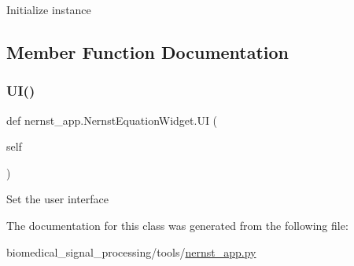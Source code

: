 \begin{DoxyVerb}Initialize instance
\end{DoxyVerb}
 

\subsection{Member Function Documentation}
\mbox{\label{classnernst__app_1_1NernstEquationWidget_a883d90598b1a75b6b4f9eac8f31e39fa}} 
\subsubsection{\texorpdfstring{U\+I()}{UI()}}
{\footnotesize\ttfamily def nernst\+\_\+app.\+Nernst\+Equation\+Widget.\+UI (\begin{DoxyParamCaption}\item[{}]{self }\end{DoxyParamCaption})}

\begin{DoxyVerb}Set the user interface
\end{DoxyVerb}
 

The documentation for this class was generated from the following file\+:\begin{DoxyCompactItemize}
\item 
biomedical\+\_\+signal\+\_\+processing/tools/\hyperlink{nernst__app_8py}{nernst\+\_\+app.\+py}\end{DoxyCompactItemize}
